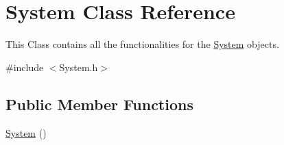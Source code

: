 \hypertarget{classSystem}{}\section{System Class Reference}
\label{classSystem}


This Class contains all the functionalities for the \hyperlink{classSystem}{System} objects.  




{\ttfamily \#include $<$System.\+h$>$}

\subsection*{Public Member Functions}
\begin{DoxyCompactItemize}
\item 
\hyperlink{classSystem_ae317936c9bcf1374d61745572e0f2f8a}{System} ()\hypertarget{classSystem_ae317936c9bcf1374d61745572e0f2f8a}{}\label{classSystem_ae317936c9bcf1374d61745572e0f2f8a}


\end{DoxyCompactItemize}
